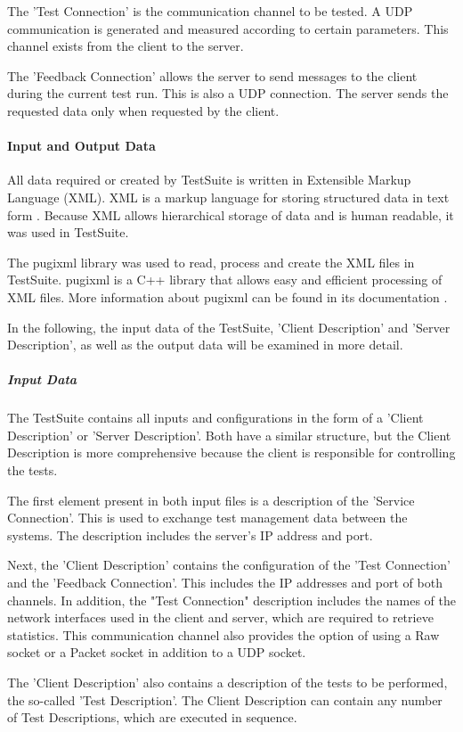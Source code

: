 The 'Test Connection' is the communication channel to be tested. A UDP communication is generated and measured according to certain parameters. This channel exists from the client to the server.

The 'Feedback Connection' allows the server to send messages to the client during the current test run. This is also a UDP connection. The server sends the requested data only when requested by the client.

\paragraph{Input and Output Data}
All data required or created by TestSuite is written in Extensible Markup Language (XML). XML is a markup language for storing structured data in text form \cite{tsd01}. Because XML allows hierarchical storage of data and is human readable, it was used in TestSuite.

The pugixml library was used to read, process and create the XML files in TestSuite. pugixml is a C++ library that allows easy and efficient processing of XML files. More information about pugixml can be found in its documentation \cite{tsd02}.

In the following, the input data of the TestSuite, 'Client Description' and 'Server Description', as well as the output data will be examined in more detail.

\subparagraph{Input Data}
The TestSuite contains all inputs and configurations in the form of a 'Client Description' or 'Server Description'. Both have a similar structure, but the Client Description is more comprehensive because the client is responsible for controlling the tests.

The first element present in both input files is a description of the 'Service Connection'. This is used to exchange test management data between the systems. The description includes the server's IP address and port.

Next, the 'Client Description' contains the configuration of the 'Test Connection' and the 'Feedback Connection'. This includes the IP addresses and port of both channels. In addition, the "Test Connection" description includes the names of the network interfaces used in the client and server, which are required to retrieve statistics. This communication channel also provides the option of using a Raw socket or a Packet socket in addition to a UDP socket.

The 'Client Description' also contains a description of the tests to be performed, the so-called 'Test Description'. The Client Description can contain any number of Test Descriptions, which are executed in sequence.

